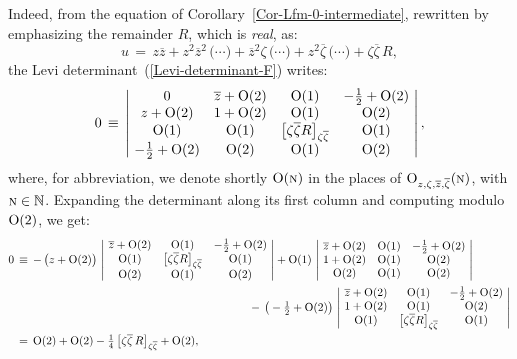 \documentclass[12pt,twoside,leqno,openany]{amsart}
\begin{document}
\proof
Indeed, from the equation
of Corollary~{\ref{Cor-Lfm-0-intermediate}}, 
rewritten by emphasizing the remainder $R$, which is
{\em real}, as:
\[
u
\,=\,
z\overline{z}
+
z^2\overline{z}^2\,
\big(\cdots\big)
+
\overline{z}^2\zeta\,
\big(\cdots\big)
+
z^2\overline{\zeta}\,
\big(\cdots\big)
+
\zeta\overline{\zeta}\,R,
\]
the Levi
determinant~({\ref{Levi-determinant-F}}) writes:
\[
0
\,\equiv\,
\left\vert\!
\begin{array}{cccc}
0 & \overline{z}+{\rm O}(2) & {\rm O}(1) &
-\frac{1}{2}+{\rm O}(2)
\\
z+{\rm O}(2) & 1 + {\rm O}(2) & {\rm O}(1) & {\rm O}(2)
\\
{\rm O}(1) & {\rm O}(1) & 
\big[\zeta\overline{\zeta}R\big]_{\zeta\overline{\zeta}} & {\rm O}(1)
\\
-\frac{1}{2}+{\rm O}(2) & {\rm O}(2) & {\rm O}(1) & {\rm O}(2)
\end{array}
\!\right\vert,
\]
where, for abbreviation, we denote shortly ${\rm O} (\text{\sc n})$
in the places of ${\rm O}_{z,\zeta,\overline{z},\overline{\zeta}}
(\text{\sc n})$, with $\text{\sc n} \in \mathbb{N}$. Expanding the determinant
along its first column and computing
modulo ${\rm O}(2)$, we get:
\[
\aligned
0
&
\,\equiv\,
-\,\big(z+{\rm O}(2)\big)\,
\left\vert\!
\begin{array}{ccc}
\overline{z}+{\rm O}(2) & {\rm O}(1) &
-\frac{1}{2}+{\rm O}(2)
\\
{\rm O}(1) & 
\big[\zeta\overline{\zeta}R\big]_{\zeta\overline{\zeta}} & {\rm O}(1)
\\
{\rm O}(2) & {\rm O}(1) & {\rm O}(2)
\end{array}
\!\right\vert
+
{\rm O}(1)\,
\left\vert\!
\begin{array}{ccc}
\overline{z}+{\rm O}(2) & {\rm O}(1) &
-\frac{1}{2}+{\rm O}(2)
\\
1 + {\rm O}(2) & {\rm O}(1) & {\rm O}(2)
\\
{\rm O}(2) & {\rm O}(1) & {\rm O}(2)
\end{array}
\!\right\vert
\\
&
\ \ \ \ \ \ \ \ \ \ \ \ \ \ \ \ \ \ \ \ \ \ \ \ \ \ \ \ \ \ \ \ \ \ \ 
\ \ \ \ \ \ \ \ \ \ \ \ \ \ \ \ \ \ \ \ \ \ \ \ \ \ \
-\,
\big(-\tfrac{1}{2}+{\rm O}(2)\big)\,\left\vert\!
\begin{array}{ccc}
\overline{z}+{\rm O}(2) & {\rm O}(1) &
-\frac{1}{2}+{\rm O}(2)
\\
1 + {\rm O}(2) & {\rm O}(1) & {\rm O}(2)
\\
{\rm O}(1) & 
\big[\zeta\overline{\zeta}R\big]_{\zeta\overline{\zeta}} & {\rm O}(1)
\end{array}
\!\right\vert
\\
&
\,=\,
{\rm O}(2)
+
{\rm O}(2)
-
\tfrac{1}{4}\,
\big[
\zeta\overline{\zeta}\,R
\big]_{\zeta\overline{\zeta}}
+
{\rm O}(2),
\endaligned
\]
\end{document}
